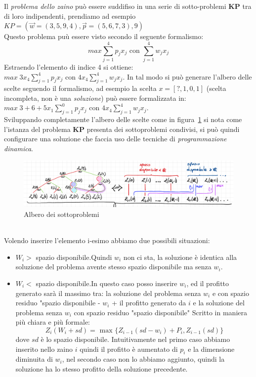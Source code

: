 \documentclass[a4paper]{article}
\begin{document}
Il \textit{problema dello zaino} può essere suddifiso in una serie di sotto-problemi \textbf{KP} tra di loro indipendenti, prendiamo ad esempio $KP = (\vec w = (3,5,9,4), \vec p = (5, 6, 7, 3),9)$\\
Questo problema puù essere visto secondo il seguente formalismo:$$ max \sum_{j=1}^4 p_jx_j \text{ con } \sum_{j=1}^4 w_jx_j$$
Estraendo l'elemento di indice 4 si ottiene: $ max\; 3x_4 \sum_{j=1}^4 p_jx_j \text{ con } 4x_4\sum_{j=1}^4 w_jx_j$.
In tal modo si può generare l'albero delle scelte seguendo il formalismo, ad esempio la scelta $x=[?,1, 0 ,1]$ (scelta incompleta, non è una \textit{soluzione}) può essere formalizzata in:
$max\; 3 + 6 +5x_1 \sum_{j=1}^0 p_jx_j \text{ con } 4x_4\sum_{j=1}^4 w_jx_j$.\\
Sviluppando completamente l'albero delle scelte come in figura~\ref{FIG:D1_albero} si nota come l'istanza del problema \textbf{KP} presenta dei sottoproblemi condivisi, si può quindi configurare una soluzione che faccia uso delle tecniche di \textit{programmazione dinamica}.
\begin{figure}[!ht]
\centering
\includegraphics[width=1\textwidth]{./img/D1_albero}
\caption{Albero dei sottoproblemi} \label{FIG:D1_albero}
\end{figure}\\
Volendo inserire l'elemento i-esimo abbiamo due possibili situazioni:
\begin{itemize}
	\item$W_i >$ spazio disponibile.Quindi $w_i$ non ci sta, la soluzione è identica alla soluzione del problema avente stesso spazio disponibile ma senza $w_i$.
	\item$W_i <$ spazio disponibile.In questo caso posso inserire $w_i$, ed il profitto generato sarà il massimo tra: la soluzione del problema senza $w_i$ e con spazio residuo "spazio disponibile - $w_i$ + il profitto generato da $i$ e la soluzione del problema senza $w_i$ con spazio residuo "spazio disponibile"
		Scritto in maniera più chiara e più formale: $$Z_i(W_i + sd)= \text{ max } \{ Z_{i-1}(sd - w_i) + P_i , Z_{i-1}(sd) \}$$ dove $sd$ è lo spazio disponibile.
		Intuitivamente nel primo caso abbiamo inserito nello zaino $i$ quindi il profitto è aumentato di $p_i$ e la dimensione diminuita di $w_i$, nel secondo caso non lo abbiamo aggiunto, quindi la soluzione ha lo stesso profitto della soluzione precedente.
\end{itemize}
\end{document}
